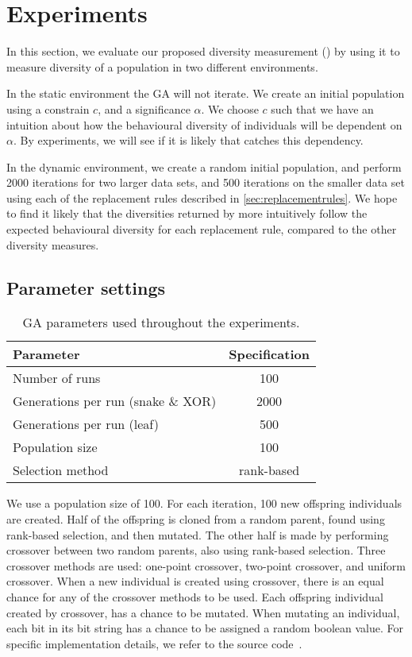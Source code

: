 \section{Experiments}
In this section, we evaluate our proposed diversity measurement (\dia) by using it to measure diversity of a population in two different environments.

In the static environment the GA will not iterate. We create an initial population using a constrain $c$, and a significance $\alpha$. We choose $c$ such that we have an intuition about how the behavioural diversity of individuals will be dependent on $\alpha$. By experiments, we will see if it is likely that \dia{} catches this dependency.

In the dynamic environment, we create a random initial population, and perform 2000 iterations for two larger data sets, and 500 iterations on the smaller data set using each of the  replacement rules described in \cref{sec:replacementrules}. We hope to find it likely that the diversities returned by \dia{} more intuitively follow the expected behavioural diversity for each replacement rule, compared to the other diversity measures.

\subsection{Parameter settings}

\begin{table}
  \centering
  \begin{tabular}{l S}
    \toprule
    Parameter & {Specification} \\
    \midrule
    Number of runs & 100 \\
    Generations per run (snake \& XOR) & 2000 \\
    Generations per run (leaf) & 500 \\
    Population size & 100 \\
    Selection method & {rank-based} \\
    \bottomrule
  \end{tabular}
  \caption{GA parameters used throughout the experiments.}
  \label{tab:gaparam}
\end{table}

We use a population size of 100. For each iteration, 100 new offspring individuals are created. Half of the offspring is cloned from a random parent, found using rank-based selection, and then mutated. The other half is made by performing crossover between two random parents, also using rank-based selection. Three crossover methods are used: one-point crossover, two-point crossover, and uniform crossover. When a new individual is created using crossover, there is an equal chance for any of the crossover methods to be used. Each offspring individual created by crossover, has a  chance to be mutated. When mutating an individual, each bit in its bit string has a  chance to be assigned a random boolean value. For specific implementation details, we refer to the source code~\cite{mbm:kmc:ekoGA}.

